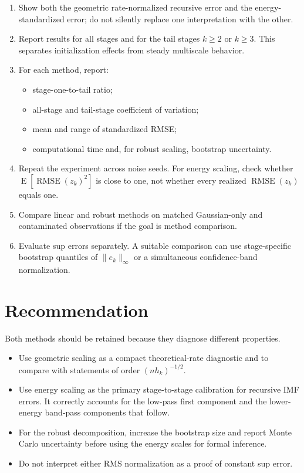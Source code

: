 \documentclass[11pt]{article}
\newcommand{\E}{\operatorname{E}}
\newcommand{\RMSE}{\operatorname{RMSE}}
\begin{document}
\begin{enumerate}
    \item Show both the geometric rate-normalized recursive error and the
    energy-standardized error; do not silently replace one interpretation with
    the other.
    \item Report results for all stages and for the tail stages $k\geq2$ or
    $k\geq3$. This separates initialization effects from steady multiscale
    behavior.
    \item For each method, report:
    \begin{itemize}
        \item stage-one-to-tail ratio;
        \item all-stage and tail-stage coefficient of variation;
        \item mean and range of standardized RMSE;
        \item computational time and, for robust scaling, bootstrap uncertainty.
    \end{itemize}
    \item Repeat the experiment across noise seeds. For energy scaling, check
    whether $\E[\RMSE(z_k)^2]$ is close to one, not whether every realized
    $\RMSE(z_k)$ equals one.
    \item Compare linear and robust methods on matched Gaussian-only and
    contaminated observations if the goal is method comparison.
    \item Evaluate sup errors separately. A suitable comparison can use
    stage-specific bootstrap quantiles of $\lVert e_k\rVert_\infty$ or a
    simultaneous confidence-band normalization.
\end{enumerate}

\section{Recommendation}

Both methods should be retained because they diagnose different properties.

\begin{itemize}
    \item Use geometric scaling as a compact theoretical-rate diagnostic and to
    compare with statements of order $(nh_k)^{-1/2}$.
    \item Use energy scaling as the primary stage-to-stage calibration for
    recursive IMF errors. It correctly accounts for the low-pass first
    component and the lower-energy band-pass components that follow.
    \item For the robust decomposition, increase the bootstrap size and report
    Monte Carlo uncertainty before using the energy scales for formal inference.
    \item Do not interpret either RMS normalization as a proof of constant sup
    error.
\end{itemize}
\end{document}
